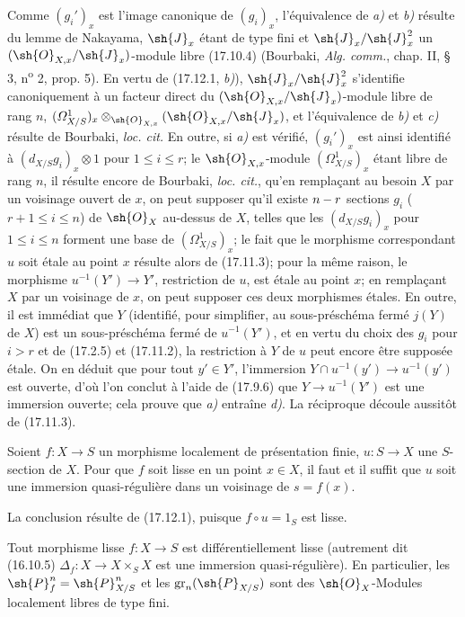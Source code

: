 Comme $(g_i')_x$ est l'image canonique de $(g_i)_x$, l'équivalence de \emph{a)} et \emph{b)} résulte du lemme de Nakayama, $\sh{J}_x$ étant de type fini et $\sh{J}_x/\sh{J}_x^2$ un $(\sh{O}_{X,x}/\sh{J}_x)$-module libre (17.10.4) (Bourbaki, \emph{Alg. comm.}, chap. II, § 3, n\textsuperscript{o} 2, prop. 5). En vertu de (17.12.1, \emph{b)}), $\sh{J}_x/\sh{J}_x^2$ s'identifie canoniquement à un facteur direct du $(\sh{O}_{X,x}/\sh{J}_x)$-module libre de rang $n$, $(\varOmega^1_{X/S})_x\otimes_{\sh{O}_{X,x}}(\sh{O}_{X,x}/\sh{J}_x)$, et l'équivalence de \emph{b)} et \emph{c)} résulte de Bourbaki, \emph{loc. cit.} En outre, si \emph{a)} est vérifié, $(g_i')_x$ est ainsi identifié à $(d_{X/S}g_i)_x\otimes1$ pour $1\leq i\leq r$; le $\sh{O}_{X,x}$-module $(\varOmega^1_{X/S})_x$ étant libre de rang $n$, il résulte encore de Bourbaki, \emph{loc. cit.}, qu'en remplaçant au besoin $X$ par un voisinage ouvert de $x$, on peut supposer qu'il existe $n- r$ sections $g_i$ ($r+1\leq i\leq n$) de $\sh{O}_X$ au-dessus de $X$, telles que les $(d_{X/S}g_i)_x$ pour $1\leq i\leq n$ forment une base de $(\varOmega^1_{X/S})_x$; le fait que le morphisme correspondant $u$ soit étale au point $x$ résulte alors de (17.11.3); pour la même raison, le morphisme $u^{-1}(Y')\to Y'$, restriction de $u$, est étale au point $x$; en remplaçant $X$ par un voisinage de $x$, on peut supposer ces deux morphismes étales. En outre, il est immédiat que $Y$ (identifié, pour simplifier, au sous-préschéma fermé $j(Y)$ de $X$) est un sous-préschéma fermé de $u^{-1}(Y')$, et en vertu du choix des $g_i$ pour $i>r$ et de (17.2.5) et (17.11.2), la restriction à $Y$ de $u$ peut encore être supposée étale. On en déduit que pour tout $y'\in Y'$, l'immersion $Y\cap u^{-1}(y')\to u^{-1}(y')$ est ouverte, d'où l'on conclut à l'aide de (17.9.6) que $Y\to u^{-1}(Y')$ est une immersion ouverte; cela prouve que \emph{a)} entraîne \emph{d)}. La réciproque découle aussitôt de (17.11.3).

\begin{corollary}[17.12.3]
\label{IV.17.12.3}
Soient $f:X\to S$ un morphisme localement de présentation finie, $u:S\to X$ une $S$-section de $X$. Pour que $f$ soit lisse en un point $x\in X$, il faut et il suffit que $u$ soit une immersion quasi-régulière dans un voisinage de $s=f(x)$.
\end{corollary}

La conclusion résulte de (17.12.1), puisque $f\circ u=1_S$ est lisse.

\begin{proposition}[17.12.4]
\label{IV.17.12.4}
Tout morphisme lisse $f:X\to S$ est différentiellement lisse \textup{(autrement dit (16.10.5) $\Delta_f:X\to X\times_SX$ est une immersion quasi-régulière)}. En particulier, les $\sh{P}_f^n=\sh{P}_{X/S}^n$ et les $\operatorname{gr}_n(\sh{P}_{X/S})$ sont des $\sh{O}_X$-Modules localement libres de type fini.
\end{proposition}

